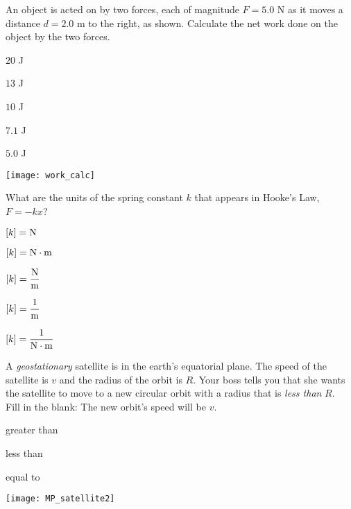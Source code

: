 \documentclass[11pt]{article}
\begin{document}
\begin{enumerate}
\begin{minipage}[t]{\lw}
\item An object is acted on by two forces, each of magnitude $F=5.0$ N as it moves a distance $d=2.0$ m to the right, as shown. Calculate the net work done on the object by the two forces.\\
\begin{minipage}[t]{.45\lw}
\begin{choices}
\item $20$ J
\item $13$ J
\item $10$ J
\item $7.1$ J
\item $5.0$ J
\end{choices}
\end{minipage}\hfill
\begin{minipage}[t]{.5\lw}
\vspace{0in}
\flushright
\texttt{[image: work\_calc]}
\end{minipage}
\end{minipage}

\begin{minipage}[t]{\lw}
\item What are the units of the spring constant $k$ that appears in Hooke's Law, $F=-kx$?
\begin{choices}
\item $[k]={\rm N}$
\item $[k]={\rm N}\cdot{\rm m}$
\item $[k]=\dfrac{\rm N}{\rm m}$
\item $[k]=\dfrac{1}{\rm m}$
\item $[k]=\dfrac{1}{{\rm N}\cdot{\rm m}}$
\end{choices}
\end{minipage}

\begin{minipage}[t]{\lw}
\item A \textit{geostationary} satellite is in the earth's equatorial plane. The speed of the satellite is $v$ and the radius of the orbit is $R$. Your boss tells you that she wants the satellite to move to a new circular orbit with a radius that is \textit{less than} $R$.\\[.1in]
Fill in the blank: The new orbit's speed will be \uline{\hspace{1in}} $v$.\\
\begin{minipage}[t]{.45\lw}
\begin{choices}
\item greater than
\item less than
\item equal to
\end{choices}
\end{minipage}\hfill
\begin{minipage}[t]{.5\lw}
\vspace{0in}
\flushright
\texttt{[image: MP\_satellite2]}
\end{minipage}
\end{minipage}


\end{enumerate}
\end{document}

